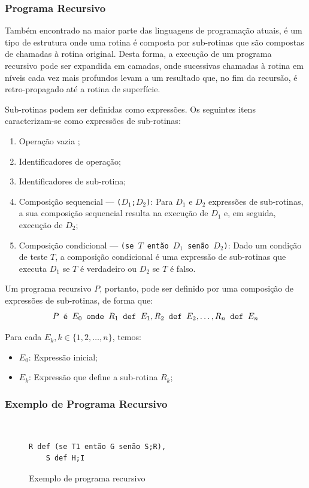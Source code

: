 \documentclass[12pt,fleqn]{article}
\begin{document}
\subsubsection{Programa Recursivo}
Também encontrado na maior parte das linguagens de programação atuais, é um
tipo de estrutura onde uma rotina é composta por sub-rotinas que são compostas
de chamadas à rotina original. Desta forma, a execução de um programa recursivo
pode ser expandida em camadas, onde sucessivas chamadas à rotina em níveis cada
vez mais profundos levam a um resultado que, no fim da recursão, é
retro-propagado até a rotina de superfície.

Sub-rotinas podem ser definidas como expressões. Os seguintes itens
caracterizam-se como expressões de sub-rotinas:

\begin{enumerate}
    \item Operação vazia \checkmark;
    \item Identificadores de operação;
    \item Identificadores de sub-rotina;
    \item Composição sequencial --- \texttt{($D_1$;$D_2$)}: Para $D_1$ e $D_2$
    expressões de sub-rotinas, a sua composição sequencial resulta na execução
    de $D_1$ e, em seguida, execução de $D_2$;
    \item Composição condicional --- \texttt{(se $T$ então $D_1$ senão $D_2$)}:
    Dado um condição de teste $T$, a composição condicional é uma expressão de
    sub-rotinas que executa $D_1$ se $T$ é verdadeiro ou $D_2$ se $T$ é falso.
\end{enumerate}

Um programa recursivo $P$, portanto, pode ser definido por uma composição de
expressões de sub-rotinas, de forma que:
\[
    P \text{\tt\ é\ } E_0 \text{\tt\ onde\ } R_1 \text{\tt\ def\ } E_1, R_2
    \text{\tt\ def\ } E_2, \dots, R_n \text{\tt\ def\ } E_n
\]

Para cada $E_k, k \in \{1, 2, \dots, n\}$, temos:

\begin{itemize}
    \item $E_0$: Expressão inicial;
    \item $E_k$: Expressão que define a sub-rotina $R_k$;
\end{itemize}

\subsubsection{Exemplo de Programa Recursivo}
~
\begin{figure}[H]
\begin{Verbatim}[commandchars=\\\{\},codes={\catcode`\$=3\catcode`\^=7}]
    R def (se T1 então G senão S;R),
    S def H;I
\end{Verbatim}
\caption{Exemplo de programa recursivo}
\end{figure}
\end{document}
